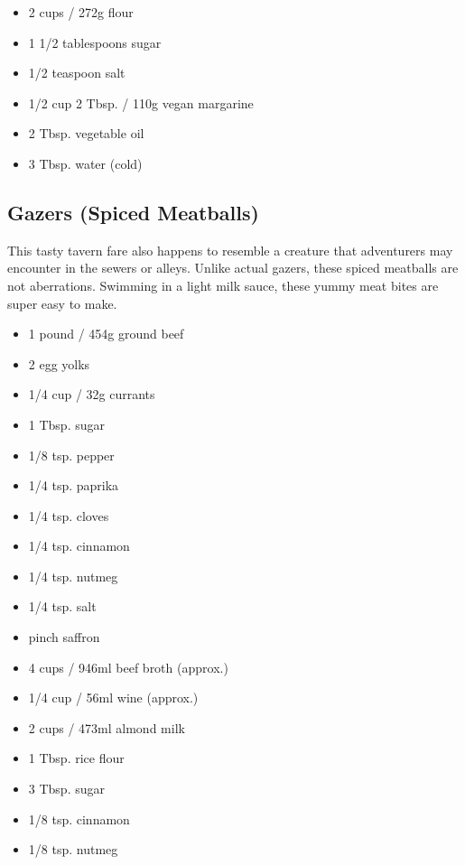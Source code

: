 \documentclass[10pt,a4paper,twoside,twocolumn,openany,bg=print,nodeprecatedcode]{dndbook}
\begin{document}
\begin{itemize}
\paragraph{For the crust vegan:}
\item 2 cups / 272g flour
\item 1 1/2 tablespoons sugar
\item 1/2 teaspoon salt
\item 1/2 cup 2 Tbsp. / 110g vegan margarine
\item 2 Tbsp. vegetable oil
\item 3 Tbsp. water (cold)
\end{itemize}

\subsection{Gazers (Spiced Meatballs)}
This tasty tavern fare also happens to resemble a creature that adventurers may encounter in the sewers or alleys. Unlike actual gazers, these spiced meatballs are not aberrations. Swimming in a light milk sauce, these yummy meat bites are super easy to make.

\begin{itemize}
\paragraph{Ingredients}
\item 1 pound / 454g ground beef
\item 2 egg yolks
\item 1/4 cup / 32g currants
\item 1 Tbsp. sugar
\item 1/8 tsp. pepper
\item 1/4 tsp. paprika
\item 1/4 tsp. cloves
\item 1/4 tsp. cinnamon
\item 1/4 tsp. nutmeg
\item 1/4 tsp. salt
\item pinch saffron
\item 4 cups / 946ml beef broth (approx.)
\item 1/4 cup / 56ml wine (approx.)
\end{itemize}


\begin{itemize}
\paragraph{Sauce:}
\item 2 cups / 473ml almond milk
\item 1 Tbsp. rice flour
\item 3 Tbsp. sugar
\item 1/8 tsp. cinnamon
\item 1/8 tsp. nutmeg
\end{itemize}
\end{document}
